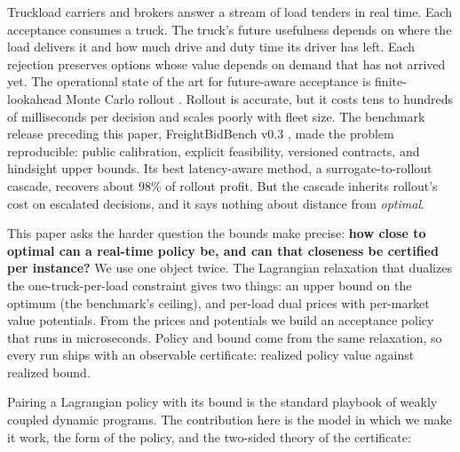 \documentclass[11pt]{article}
\begin{document}
Truckload carriers and brokers answer a stream of load tenders in real
time. Each acceptance consumes a truck. The truck's future usefulness
depends on where the load delivers it and how much drive and duty time
its driver has left. Each rejection preserves options whose value
depends on demand that has not arrived yet. The operational state of
the art for future-aware acceptance is finite-lookahead Monte Carlo
rollout \citep{bertsekas1997rollout,goodson2017rollout}. Rollout is
accurate, but it costs tens to hundreds of milliseconds per decision
and scales poorly with fleet size. The benchmark release preceding this
paper, FreightBidBench v0.3 \citep{chandrasekaran2026freightbidbench},
made the problem reproducible: public calibration, explicit
feasibility, versioned contracts, and hindsight upper bounds. Its best
latency-aware method, a surrogate-to-rollout cascade, recovers about
$98\%$ of rollout profit. But the cascade inherits rollout's cost on
escalated decisions, and it says nothing about distance from
\emph{optimal}.

This paper asks the harder question the bounds make precise:
\textbf{how close to optimal can a real-time policy be, and can that
closeness be certified per instance?} We use one object twice. The
Lagrangian relaxation that dualizes the one-truck-per-load constraint
gives two things: an upper bound on the optimum (the benchmark's
ceiling), and per-load dual prices with per-market value potentials.
From the prices and potentials we build an acceptance policy that runs
in microseconds. Policy and bound come from the same relaxation, so
every run ships with an observable certificate: realized policy value
against realized bound.

Pairing a Lagrangian policy with its bound is the standard playbook of
weakly coupled dynamic programs. The contribution here is the model in
which we make it work, the form of the policy, and the two-sided theory
of the certificate:
\end{document}
